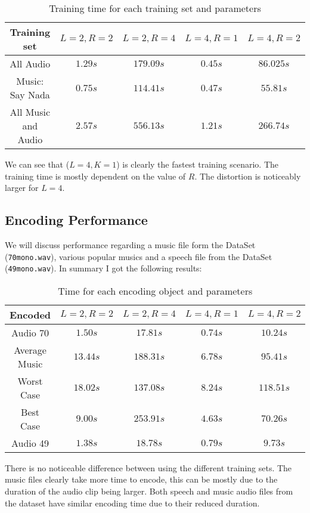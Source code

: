 \documentclass[a4paper, 11pt]{article}
\begin{document}
			\begin{table}[H]
				\centering
				\begin{tabular}{c|c|c|c|c}
					\textbf{Training set}	 	& \textbf{$ L=2, R=2 $} 	& \textbf{$ L=2, R=4 $}	&  \textbf{$ L=4, R=1 $}	& \textbf{$ L=4, R=2 $} \\ \hline
					All Audio 					& $ 1.29 s $ 	& $ 179.09 s $	& $ 0.45 s $ 	& $ 86.02 5 s $	\\ \hline
					Music: Say Nada				& $ 0.75 s $	& $ 114.41 s $	& $ 0.47 s $ 	& $ 55.81 s $	\\ \hline
					All Music and Audio 	& $ 2.57 s $	& $	556.13 s $	& $ 1.21 s $	& $	266.74 s $	\\
				\end{tabular}
				\caption{Training time for each training set and parameters}
				\label{table:TrainTime}
			\end{table}
		
			We can see that ($ L=4, K=1 $) is clearly the fastest training scenario.
			The training time is mostly dependent on the value of $ R $.
			The distortion is noticeably larger for $ L = 4 $.
			
		\subsection{Encoding Performance}
			We will discuss performance regarding a music file form the DataSet (\texttt{70mono.wav}), various popular musics and a speech file from the DataSet (\texttt{49mono.wav}).
			In summary I got the following results:
			
			\begin{table}[H]
				\centering
				\begin{tabular}{c|c|c|c|c}
					\textbf{Encoded}	& \textbf{$ L=2, R=2 $} 	& \textbf{$ L=2, R=4 $}	&  \textbf{$ L=4, R=1 $}	& \textbf{$ L=4, R=2 $} \\ \hline
					Audio 70				& $ 1.50 s $ 	& $ 17.81 s $	& $ 0.74 s $ 	& $ 10.24 s $	\\ \hline
					Average Music			& $ 13.44 s $	& $ 188.31 s $	& $ 6.78 s $ 	& $ 95.41 s $	\\ \hline	
					Worst Case				& $ 18.02 s $	& $	137.08 s $	& $ 8.24 s $	& $	118.51 s $	\\ \hline
					Best Case				& $ 9.00 s $	& $	253.91 s $	& $ 4.63 s $	& $	70.26 s $	\\ \hline
					Audio 49				& $ 1.38 s $	& $	18.78 s $	& $ 0.79 s $	& $	9.73 s $	\\
				\end{tabular}
				\caption{Time for each encoding object and parameters}
				\label{table:EncodeTime}
			\end{table}
			There is no noticeable difference between using the different training sets.
			The music files clearly take more time to encode, this can be mostly due to the duration of the audio clip being larger.
			Both speech and music audio files from the dataset have similar encoding time due to their reduced duration.
			
\end{document}

